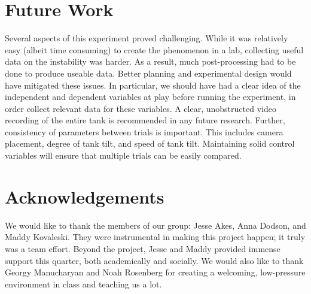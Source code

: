 \documentclass{article}
\begin{document}
\section{Future Work}

Several aspects of this experiment proved challenging. While it was relatively
easy (albeit time consuming) to create the phenomenon in a lab, collecting
useful data on the instability was harder. As a result, much post-processing had
to be done to produce useable data. Better planning and experimental design
would have mitigated these issues. In particular, we should have had a clear
idea of the independent and dependent variables at play before running the
experiment, in order collect relevant data for these variables. A clear,
unobstructed video recording of the entire tank is recommended in any future
research. Further, consistency of parameters between trials is important. This
includes camera placement, degree of tank tilt, and speed of tank tilt.
Maintaining solid control variables will ensure that multiple trials can be
easily compared.


\section{Acknowledgements}

We would like to thank the members of our group: Jesse Akes, Anna Dodson, and
Maddy Kovaleski. They were instrumental in making this project happen; it truly
was a team effort. Beyond the project, Jesse and Maddy provided immense support
this quarter, both academically and socially. We would also like to thank Georgy
Manucharyan and Noah Rosenberg for creating a welcoming, low-pressure
environment in class and teaching us a lot.  

\newpage
{}

\end{document}
